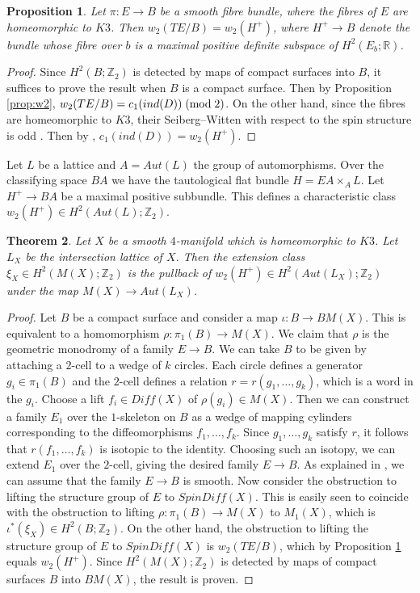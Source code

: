 \documentclass{amsart}
\newtheorem{theorem}{Theorem}[section]
\newtheorem{proposition}[theorem]{Proposition}
\theoremstyle{definition}
\theoremstyle{remark}
\numberwithin{equation}{section}
\begin{document}
\begin{proposition}\label{prop:w2+}
Let $\pi : E \to B$ be a smooth fibre bundle, where the fibres of $E$ are homeomorphic to $K3$. Then $w_2(TE/B) = w_2(H^+)$, where $H^+ \to B$ denote the bundle whose fibre over $b$ is a maximal positive definite subspace of $H^2( E_b ; \mathbb{R})$.
\end{proposition}
\begin{proof}
Since $H^2(B ; \mathbb{Z}_2)$ is detected by maps of compact surfaces into $B$, it suffices to prove the result when $B$ is a compact surface. Then by Proposition \ref{prop:w2}, $w_2(TE/B) = c_1( ind(D)) \; ({\rm mod} \; 2)$. On the other hand, since the fibres are homeomorphic to $K3$, their Seiberg--Witten with respect to the spin structure is odd \cite{ms}. Then by \cite[Corollary 1.3]{bk2},  $c_1(ind(D)) = w_2(H^+)$.
\end{proof}

Let $L$ be a lattice and $A = Aut(L)$ the group of automorphisms. Over the classifying space $BA$ we have the tautological flat bundle $H = EA \times_{A} L$. Let $H^+ \to BA$ be a maximal positive subbundle. This defines a characteristic class $w_2(H^+) \in H^2( Aut(L) ; \mathbb{Z}_2)$.

\begin{theorem}
Let $X$ be a smooth $4$-manifold which is homeomorphic to $K3$. Let $L_X$ be the intersection lattice of $X$. Then the extension class $\xi_X \in H^2( M(X) ; \mathbb{Z}_2)$ is the pullback of $w_2(H^+) \in H^2( Aut(L_X) ; \mathbb{Z}_2 )$ under the map $M(X) \to Aut(L_X)$.
\end{theorem}
\begin{proof}
Let $B$ be a compact surface and consider a map $\iota : B \to BM(X)$. This is equivalent to a homomorphism $\rho : \pi_1(B) \to M(X)$. We claim that $\rho$ is the geometric monodromy of a family $E \to B$. We can take $B$ to be given by attaching a $2$-cell to a wedge of $k$ circles. Each circle defines a generator $g_i \in \pi_1(B)$ and the $2$-cell defines a relation $r = r(g_1, \dots , g_k)$, which is a word in the $g_i$. Choose a lift $f_i \in Diff(X)$ of $\rho(g_i) \in M(X)$. Then we can construct a family $E_1$ over the $1$-skeleton on $B$ as a wedge of mapping cylinders corresponding to the diffeomorphisms $f_1, \dots , f_k$. Since $g_1, \dots , g_k$ satisfy $r$, it follows that $r(f_1, \dots , f_k)$ is isotopic to the identity. Choosing such an isotopy, we can extend $E_1$ over the $2$-cell, giving the desired family $E \to B$. As explained in \cite[Remark 4.20]{bk2}, we can assume that the family $E \to B$ is smooth. Now consider the obstruction to lifting the structure group of $E$ to $SpinDiff(X)$. This is easily seen to coincide with the obstruction to lifting $\rho : \pi_1(B) \to M(X)$ to $M_1(X)$, which is $\iota^*( \xi_X) \in H^2(B ; \mathbb{Z}_2)$. On the other hand, the obstruction to lifting the structure group of $E$ to $SpinDiff(X)$ is $w_2(TE/B)$, which by Proposition \ref{prop:w2+} equals $w_2(H^+)$. Since $H^2( M(X) ; \mathbb{Z}_2)$ is detected by maps of compact surfaces $B$ into $BM(X)$, the result is proven.
\end{proof}
\end{document}

